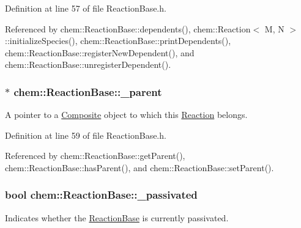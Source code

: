 Definition at line 57 of file Reaction\-Base.\-h.



Referenced by chem\-::\-Reaction\-Base\-::dependents(), chem\-::\-Reaction$<$ M, N $>$\-::initialize\-Species(), chem\-::\-Reaction\-Base\-::print\-Dependents(), chem\-::\-Reaction\-Base\-::register\-New\-Dependent(), and chem\-::\-Reaction\-Base\-::unregister\-Dependent().

\hypertarget{classchem_1_1ReactionBase_a662547106ad4d617495099e9fd85cc06}{
\subsubsection[{\-\_\-parent}]{$\ast$ {\bf chem\-::\-Reaction\-Base\-::\-\_\-parent}}}\label{classchem_1_1ReactionBase_a662547106ad4d617495099e9fd85cc06}


A pointer to a \hyperlink{classchem_1_1Composite}{Composite} object to which this \hyperlink{classchem_1_1Reaction}{Reaction} belongs. 



Definition at line 59 of file Reaction\-Base.\-h.



Referenced by chem\-::\-Reaction\-Base\-::get\-Parent(), chem\-::\-Reaction\-Base\-::has\-Parent(), and chem\-::\-Reaction\-Base\-::set\-Parent().

\hypertarget{classchem_1_1ReactionBase_a757ed91c018c8fa643472860df309804}{
\subsubsection[{\-\_\-passivated}]{\setlength{\rightskip}{0pt plus 5cm}bool {\bf chem\-::\-Reaction\-Base\-::\-\_\-passivated}}}\label{classchem_1_1ReactionBase_a757ed91c018c8fa643472860df309804}


Indicates whether the \hyperlink{classchem_1_1ReactionBase}{Reaction\-Base} is currently passivated. 



